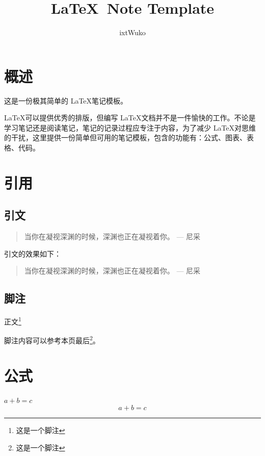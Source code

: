 \documentclass{note}
\title{\LaTeX \ Note Template}
\author{ixtWuko}
\begin{document}
\maketitle


%


\section{概述}
这是一份极其简单的 \LaTeX 笔记模板。

\LaTeX 可以提供优秀的排版，但编写 \LaTeX 文档并不是一件愉快的工作。不论是学习笔记还是阅读笔记，笔记的记录过程应专注于内容，为了减少 \LaTeX 对思维的干扰，这里提供一份简单但可用的笔记模板，包含的功能有：公式、图表、表格、代码。


\section{引用}
\subsection{引文}
\begin{texcodesample}
    \begin{quote}
        当你在凝视深渊的时候，深渊也正在凝视着你。 --- 尼采
    \end{quote}
\end{texcodesample}

引文的效果如下：
\begin{quote}
    当你在凝视深渊的时候，深渊也正在凝视着你。 --- 尼采
\end{quote}

\subsection{脚注}
\begin{texcodesample}
    正文\footnote{这是一个脚注}
\end{texcodesample}

脚注内容可以参考本页最后\footnote{这是一个脚注}。


\section{公式}
\begin{texcodesample}
    $a + b = c$        %
    \[ a + b = c \]    %
\end{texcodesample}
\end{document}
